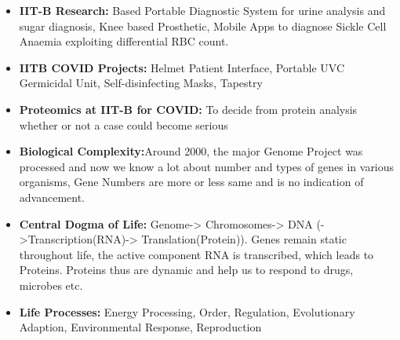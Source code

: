 \documentclass{article}
\begin{document}
\begin{itemize}
    \item \textbf{IIT-B Research:} Based Portable Diagnostic System for urine analysis and sugar diagnosis, Knee based Prosthetic, Mobile Apps to diagnose Sickle Cell Anaemia exploiting differential RBC count.


    \item \textbf{IITB COVID Projects:} Helmet Patient Interface, Portable UVC Germicidal Unit, Self-disinfecting Masks, Tapestry

    \item \textbf{Proteomics at IIT-B for COVID:} To decide from protein analysis whether or not a case could become serious
    \item \textbf{Biological Complexity:}Around 2000, the major Genome Project was processed and now we know a lot about number and types of genes in various organisms, Gene Numbers are more or less same and is no indication of advancement.

    \item \textbf{Central Dogma of Life:} Genome-> Chromosomes-> DNA (->Transcription(RNA)-> Translation(Protein)). Genes remain static throughout life, the active component RNA is transcribed, which leads to Proteins. Proteins thus are dynamic and help us to respond to drugs, microbes etc.

    \item \textbf{Life Processes:} Energy Processing, Order, Regulation, Evolutionary Adaption, Environmental Response, Reproduction


\end{itemize}
\end{document}
